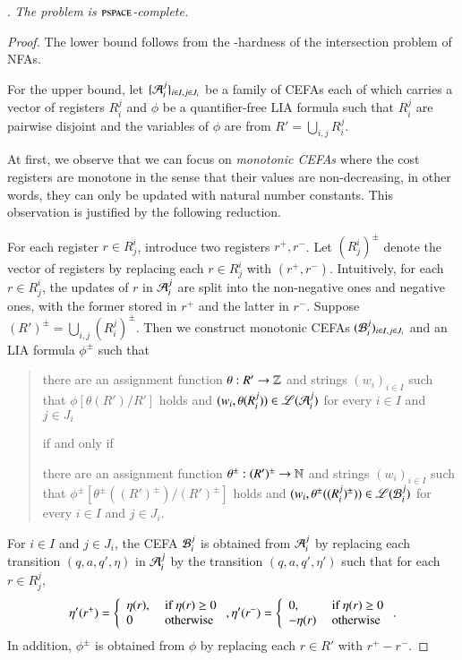 .
\emph{The {\lasat} problem is $\textsc{pspace}$-complete.}
	
\begin{proof}
The lower bound follows from the {\pspace}-hardness of the intersection problem of NFAs. 

For the upper bound, let $\{ \mathcal{A}_i^{j} \}_{i\in I,j\in J_i}$ be a family of CEFAs  each of which carries a vector of registers $R_i^j$ and  $\phi$ be a quantifier-free LIA formula such that  $ R_i^{j} $ are pairwise disjoint and the variables of $\phi$ are from $R'=\bigcup_{i,j} R_i^j$. 

At first, we observe that we can focus on \emph{monotonic CEFAs} where the cost registers are monotone in the sense that their values are non-decreasing, in other words, they can only be updated with natural number constants. This observation is justified by the following reduction.

For each register $r \in R^i_j$, introduce two registers $r^+, r^-$. Let $(R^i_j)^{\pm}$ denote the vector of registers by replacing each $r \in R^i_j$ with $(r^+, r^-)$. Intuitively,  for each $r \in R^i_j$, the updates of $r$ in $\mathcal{A}_i^{j} $ are split into the non-negative ones and negative ones, with the former stored in $r^+$ and the latter in $r^-$. Suppose $(R')^{\pm} = \bigcup_{i,j} (R_i^j)^{\pm}$. Then we construct monotonic CEFAs $(\mathcal{B}_i^{j})_{i \in I, j \in J_i}$ and an LIA formula $\phi^\pm$ such that
\begin{quote}
	there are an assignment function $\theta: R' \rightarrow \mathbb{Z}$ and strings $(w_i)_{i \in I}$ such that  $\phi[\theta(R' )/R']$ holds and $(w_i, \theta(R_i^j)) \in \mathscr{L}(\mathcal{A}_{i}^j)$ for every $i \in I$ and $j \in J_i$ 
	\begin{center} if and only if \end{center}
	there are an assignment function $\theta^\pm: (R')^\pm \rightarrow \mathbb{N}$ and strings $(w_i)_{i \in I}$ such that  $\phi^\pm[\theta^\pm((R')^\pm)/(R')^\pm]$ holds and $(w_i, \theta^\pm((R_i^j)^\pm)) \in \mathscr{L}(\mathcal{B}_{i}^j)$ for every $i \in I$ and $j \in J_i$.
\end{quote}
For $i \in I$ and $j \in J_i$, the CEFA $\mathcal{B}_{i}^j$ is obtained from $\mathcal{A}_{i}^j$ by replacing each transition $(q, a, q', \eta)$ in $\mathcal{A}_i^j$ by the transition $(q, a, q', \eta')$ such that for each $r \in R_j^j$, 
\[
\eta'(r^+) = \left\{ \begin{array}{l  l}\eta(r), & \mbox{ if } \eta(r) \ge 0 \\ 0 & \mbox{ otherwise} \end{array}\right.,  \eta'(r^-) = \left\{ \begin{array}{l  l} 0, & \mbox{ if } \eta(r) \ge 0 \\ -\eta(r) & \mbox{ otherwise} \end{array}\right..
\]
In addition, $\phi^\pm$ is obtained from $\phi$ by replacing each $r \in R'$ with $r^+-r^-$.


\end{proof}
